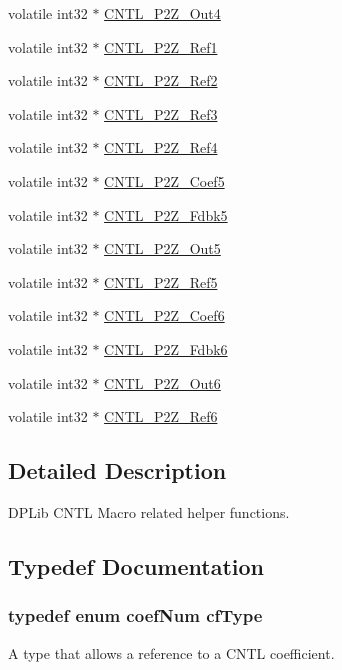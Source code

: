 \begin{DoxyCompactItemize}
volatile int32 $\ast$ \hyperlink{a00014_a253e4070b19470606e0566ff25fc911f}{C\-N\-T\-L\-\_\-P2\-Z\-\_\-\-Out4}
\item 
volatile int32 $\ast$ \hyperlink{a00014_a98527ce76f5175fa2933d46f324d85fb}{C\-N\-T\-L\-\_\-P2\-Z\-\_\-\-Ref1}
\item 
volatile int32 $\ast$ \hyperlink{a00014_a9bf1756a901a3a74d9f43a51f85cede4}{C\-N\-T\-L\-\_\-P2\-Z\-\_\-\-Ref2}
\item 
volatile int32 $\ast$ \hyperlink{a00014_a859e9bbd5bc82f1b42863a93e4f992af}{C\-N\-T\-L\-\_\-P2\-Z\-\_\-\-Ref3}
\item 
volatile int32 $\ast$ \hyperlink{a00014_af54c55f228deb8189c44282a94a870c1}{C\-N\-T\-L\-\_\-P2\-Z\-\_\-\-Ref4}
\item 
volatile int32 $\ast$ \hyperlink{a00014_a5fe3f4dd6aac27512c9e0b6fc843b0b6}{C\-N\-T\-L\-\_\-P2\-Z\-\_\-\-Coef5}
\item 
volatile int32 $\ast$ \hyperlink{a00014_af5cbb635f31bbebd041e8543deb40dee}{C\-N\-T\-L\-\_\-P2\-Z\-\_\-\-Fdbk5}
\item 
volatile int32 $\ast$ \hyperlink{a00014_a3b336a91d25a7feb9f8927b32b800d0d}{C\-N\-T\-L\-\_\-P2\-Z\-\_\-\-Out5}
\item 
volatile int32 $\ast$ \hyperlink{a00014_abd3b240e2d3f7d3f4f717066ee8efd3e}{C\-N\-T\-L\-\_\-P2\-Z\-\_\-\-Ref5}
\item 
volatile int32 $\ast$ \hyperlink{a00014_ac7b2d6195e1c497429235d54ebbd9087}{C\-N\-T\-L\-\_\-P2\-Z\-\_\-\-Coef6}
\item 
volatile int32 $\ast$ \hyperlink{a00014_a1ce5f290e8eb4fd89ae9787e7020e062}{C\-N\-T\-L\-\_\-P2\-Z\-\_\-\-Fdbk6}
\item 
volatile int32 $\ast$ \hyperlink{a00014_a3fa3864d3225e966af68bdea65781464}{C\-N\-T\-L\-\_\-P2\-Z\-\_\-\-Out6}
\item 
volatile int32 $\ast$ \hyperlink{a00014_a2e5a137088ca653c5642c3bb9cbaec9d}{C\-N\-T\-L\-\_\-P2\-Z\-\_\-\-Ref6}
\end{DoxyCompactItemize}


\subsection{Detailed Description}
D\-P\-Lib C\-N\-T\-L Macro related helper functions. 

\subsection{Typedef Documentation}
\hypertarget{a00014_ac340fbbc5919954c173757935549588f}{
\subsubsection[{cf\-Type}]{\setlength{\rightskip}{0pt plus 5cm}typedef enum {\bf coef\-Num} {\bf cf\-Type}}}\label{a00014_ac340fbbc5919954c173757935549588f}
A type that allows a reference to a C\-N\-T\-L coefficient. 

